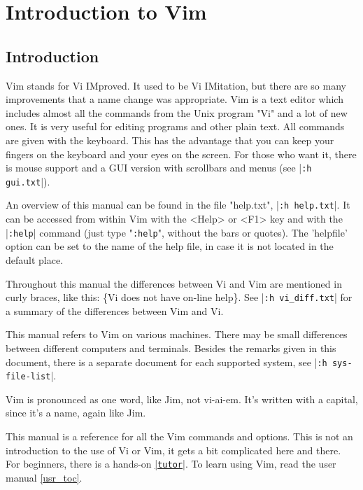 \section{Introduction to Vim}
\label{ref}
\label{reference}
\subsection{Introduction}
\label{intro}
Vim stands for Vi IMproved.
It used to be Vi IMitation, but there are so many improvements that a name change was appropriate.
Vim is a text editor which includes almost all the commands from the Unix program "Vi" and a lot of new ones.
It is very useful for editing programs and other plain text.
All commands are given with the keyboard.
This has the advantage that you can keep your fingers on the keyboard and your eyes on the screen.
For those who want it, there is mouse support and a GUI version with scrollbars and menus (see |\verb!:h gui.txt!|).

An overview of this manual can be found in the file "help.txt", |\verb!:h help.txt!|.
It can be accessed from within Vim with the <Help> or <F1> key and with the |\verb!:help!| command (just type "\verb!:help!", without the bars or quotes).
The 'helpfile' option can be set to the name of the help file, in case it is not located in the default place.

Throughout this manual the differences between Vi and Vim are mentioned in curly braces, like this: \{Vi does not have on-line help\}.
See |\verb!:h vi_diff.txt!| for a summary of the differences between Vim and Vi.

This manual refers to Vim on various machines.
There may be small differences between different computers and terminals.
Besides the remarks given in this document, there is a separate document for each supported system, see |\verb!:h sys-file-list!|.

\label{pronounce}
Vim is pronounced as one word, like Jim, not vi-ai-em.
It's written with a capital, since it's a name, again like Jim.

This manual is a reference for all the Vim commands and options.
This is not an introduction to the use of Vi or Vim, it gets a bit complicated here and there.
For beginners, there is a hands-on \hyperref[tutor]{|\texttt{tutor}|}.
To learn using Vim, read the user manual \ref{usr_toc}.

